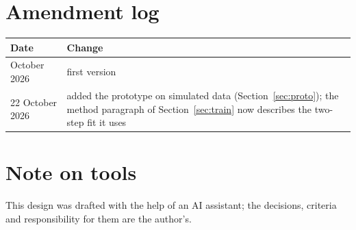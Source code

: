 \section{Amendment log}\label{sec:amend}
\begin{center}\small\begin{tabular}{@{}p{3cm}p{10.7cm}@{}}\toprule\rowcolor{dghead}
Date & Change\\\midrule
October 2026 & first version\\
22 October 2026 & added the prototype on simulated data (Section~\ref{sec:proto}); the method paragraph of Section~\ref{sec:train} now describes the two-step fit it uses\\
\bottomrule\end{tabular}\end{center}

\section*{Note on tools}
This design was drafted with the help of an AI assistant; the decisions, criteria and responsibility for them are the author's.

